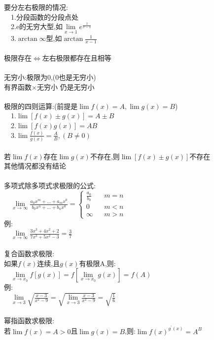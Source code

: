 \documentclass{article}
\begin{document}
\begin{flushleft}
	要分左右极限的情况:\\
	\ \ 1.分段函数的分段点处\\
	\ \ 2.e的无穷大型,如$\lim\limits_{x\to 1} e^{\frac{1}{x-1}}$\\
	\ \ 3.$\arctan\infty$型,如$\arctan{\frac{1}{x-1}}$\\
	~\\
	极限存在$\Leftrightarrow$左右极限都存在且相等\\
	~\\
	无穷小:极限为0,(0也是无穷小)\\
	有界函数$\times$无穷小 仍是无穷小\\
	~\\
	极限的四则运算:(前提是$\lim f(x)=A,\lim g(x)=B$)\\
	\ \ 1.$\lim [f(x)\pm g(x)]=A\pm B$\\
	\ \ 2.$\lim [f(x)g(x)]=AB$\\
	\ \ 3.$\lim \frac{f(x)}{g(x)} =\frac{A}{B},(B\neq 0)$\\
	~\\
	若$\lim f(x)$存在$\lim g(x)$不存在,则$\lim [f(x)\pm g(x)]$不存在\\
	其他情况都没有结论\\
	~\\
	多项式除多项式求极限的公式:\\
	\ \ $\lim\limits_{x\to \infty} \frac{a_0x^m+...+a_mx^0}{b_0x^n+...+b_nx^0}=
	\left\{
	\begin{array}{rcl}
	\frac{a_0}{b_0} & & {m=n}\\
	0 & & {m<n}\\
	\infty & & {m>n}
	\end{array} \right.$\\
	例:\\
	\ \ $\lim\limits_{x\to \infty} \frac{3x^3+4x^2+2}{7x^3+5x^2-3} = \frac{3}{7}$\\
	~\\
	复合函数求极限:\\
	如果$f(x)$连续,且$g(x)$有极限A,则:\\
	\ \ $\lim\limits_{x\to x_0} f[g(x)]=f[\lim\limits_{x\to x_0}g(x)]=f(A)$\\
	例:\\
	\ \ $\lim\limits_{x\to 3} \sqrt{\frac{x-3}{x^2-9}}= \sqrt{\lim\limits_{x\to 3} \frac{x-3}{x^2-9}}=\sqrt{\frac{1}{6}}$\\
	~\\
	幂指函数求极限:\\
	若$\lim f(x)=A>0$且$\lim g(x)=B$,则:$\lim f(x)^{g^{'}(x)}=A^B$\\
	

\end{flushleft}
\end{document}
